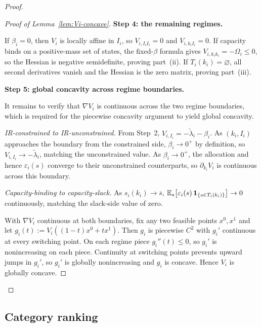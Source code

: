 \documentclass[master.tex]{subfiles}
\begin{document}
\begin{proof}
\begin{proof}[Proof of Lemma~\ref{lem:Vi-concave}]
\noindent\textbf{Step 4: the remaining regimes.}

If $\beta_i=0$, then $V_i$ is locally affine in $I_i$, so $V_{i,I_iI_i}=0$ and $V_{i,k_iI_i}=0$. If capacity binds on a positive-mass set of states, the fixed-$\beta$ formula gives $V_{i,k_ik_i}=-\Omega_i\le 0$, so the Hessian is negative semidefinite, proving part~(ii). If $T_i(k_i)=\varnothing$, all second derivatives vanish and the Hessian is the zero matrix, proving part~(iii).


\noindent\textbf{Step 5: global concavity across regime boundaries.}

It remains to verify that $\nabla V_i$ is continuous across the two regime boundaries, which is required for the piecewise concavity argument to yield global concavity.

\textit{IR-constrained to IR-unconstrained.} From Step~2, $V_{i,I_i}=-\tilde\lambda_i-\beta_i$. As $(k_i,I_i)$ approaches the boundary from the constrained side, $\beta_i\to 0^+$ by definition, so $V_{i,I_i}\to -\tilde\lambda_i$, matching the unconstrained value. As $\beta_i\to 0^+$, the allocation and hence $\varepsilon_i(s)$ converge to their unconstrained counterparts, so $\partial_{k_i}V_i$ is continuous across this boundary.

\textit{Capacity-binding to capacity-slack.} As $s_i(k_i)\to\overline s$, $\mathbb{E}_s\!\left[\varepsilon_i(s)\,\mathbf{1}_{\{s\in T_i(k_i)\}}\right]\to 0$ continuously, matching the slack-side value of zero.

With $\nabla V_i$ continuous at both boundaries, fix any two feasible points $x^0,x^1$ and let $g_i(t):=V_i((1-t)x^0+tx^1)$. Then $g_i$ is piecewise $C^2$ with $g_i'$ continuous at every switching point. On each regime piece $g_i''(t)\le 0$, so $g_i'$ is nonincreasing on each piece. Continuity at switching points prevents upward jumps in $g_i'$, so $g_i'$ is globally nonincreasing and $g_i$ is concave. Hence $V_i$ is globally concave.
\end{proof}
\end{proof}
\subsection{Category ranking}
\end{document}
